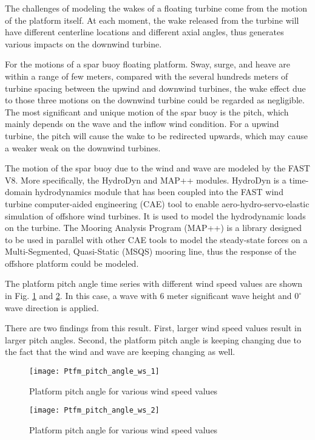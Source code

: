 \documentclass{umthesis}
\begin{document}
The challenges of modeling the wakes of a floating turbine come from the motion of the platform itself. At each moment, the wake released from the turbine will have different centerline locations and different axial angles, thus generates various impacts on the downwind turbine.

For the motions of a spar buoy floating platform. Sway, surge, and heave are within a range of few meters, compared with the several hundreds meters of turbine spacing between the upwind and downwind turbines, the wake effect due to those three motions on the downwind turbine could be regarded as negligible. The most significant and unique motion of the spar buoy is the pitch, which mainly depends on the wave and the inflow wind condition. For a upwind turbine, the pitch will cause the wake to be redirected upwards, which may cause a weaker weak on the downwind turbines. 

The motion of the spar buoy due to the wind and wave are modeled by the FAST V8. More specifically, the HydroDyn \cite{hydrodyn} and MAP++ \cite{map} modules. HydroDyn is a time-domain hydrodynamics module that has been coupled into the FAST wind turbine computer-aided engineering (CAE) tool to enable aero-hydro-servo-elastic simulation of offshore wind turbines. It is used to model the hydrodynamic loads on the turbine. The Mooring Analysis Program (MAP++) is a library designed to be used in parallel with other CAE tools to model the steady-state forces on a Multi-Segmented, Quasi-Static (MSQS) mooring line, thus the response of the offshore platform could be modeled.

The platform pitch angle time series with different wind speed values are shown in Fig. \ref{fig:Ptfm_pitch_angle_ws_1} and \ref{fig:Ptfm_pitch_angle_ws_2}. In this case, a wave with 6 meter significant wave height and $0^\circ$ wave direction is applied. 

There are two findings from this result. First, larger wind speed values result in larger pitch angles. Second, the platform pitch angle is keeping changing due to the fact that the wind and wave are keeping changing as well.
 
\begin{figure}
  \centering
  \texttt{[image: Ptfm\_pitch\_angle\_ws\_1]}
  \caption{Platform pitch angle for various wind speed values}\label{fig:Ptfm_pitch_angle_ws_1}
\end{figure}

\begin{figure}
  \centering
  \texttt{[image: Ptfm\_pitch\_angle\_ws\_2]}
  \caption{Platform pitch angle for various wind speed values}\label{fig:Ptfm_pitch_angle_ws_2}
\end{figure}
\end{document}

